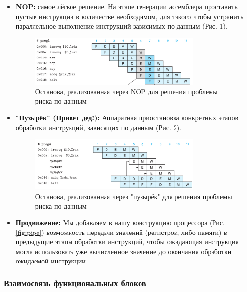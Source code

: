 \documentclass[12pt,a4paper]{article}
\begin{document}
\begin{itemize}
    \item \textbf{NOP:} самое лёгкое решение. На этапе генерации ассемблера проставить пустые инструкции в количестве необходимом, для такого чтобы устранить параллельное выполнение инструкций зависимых по данным (Рис. \ref{fig:nop}).
    \begin{figure}[h!]
        \centering
        \includegraphics[width=0.8\textwidth]{nop.png}
        \caption{Останова, реализованная через NOP для решения проблемы риска по данным}
        \label{fig:nop}
    \end{figure}

    \item \textbf{"Пузырёк" (Привет дед!): } Аппаратная приостановка конкретных этапов обработки инструкций, зависящих по данным (Рис. \ref{fig:babble}).
    \begin{figure}[h!]
        \centering
        \includegraphics[width=0.8\textwidth]{babble.png}
        \caption{Останова, реализованная через "пузырёк" для решения проблемы риска по данным}
        \label{fig:babble}
    \end{figure}

    \item \textbf{Продвижение: } Мы добавляем в нашу конструкцию процессора (Рис. \ref{fig:pipe}) возможность передачи значений (регистров, либо памяти) в предыдущие этапы обработки инструкций, чтобы ожидающая инструкция могла использовать уже вычисленное значение до окончания обработки ожидаемой инструкции.
\end{itemize}

\subsubsection{Взаимосвязь функциональных блоков}
\end{document}
